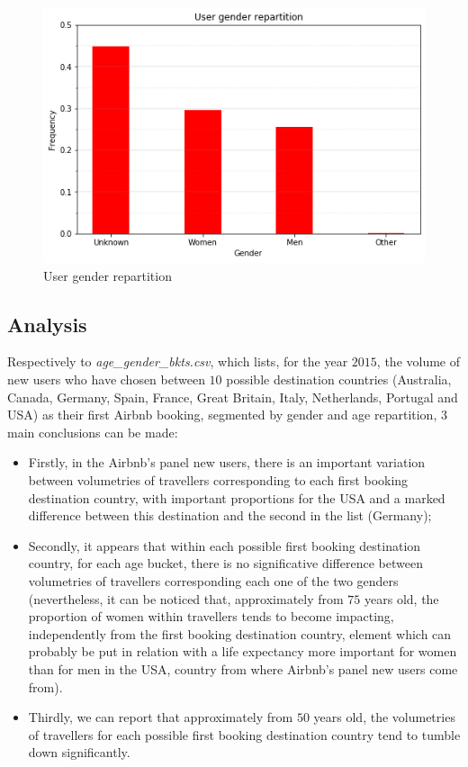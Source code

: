 \documentclass[twocolumn, switch]{article}
\begin{document}
\begin{figure}[H]
\centering
\includegraphics[scale=0.35]{../graphs/train_users_2_gender}
\caption{User gender repartition}
\label{fig:gender}
\end{figure}

\subsection{Analysis}

Respectively to \textit{age\_gender\_bkts.csv}, which lists, for the year $2015$, the volume of new users who have chosen between $10$ possible destination countries (Australia, Canada, Germany, Spain, France, Great Britain, Italy, Netherlands, Portugal and USA) as their first Airbnb booking, segmented by gender and age repartition, $3$ main conclusions can be made:
\begin{itemize}
\item Firstly, in the Airbnb's panel new users, there is an important variation between volumetries of travellers corresponding to each first booking destination country, with important proportions for the USA and a marked difference between this destination and the second in the list (Germany);
\item Secondly, it appears that within each possible first booking destination country, for each age bucket, there is no significative difference between volumetries of travellers corresponding each one of the two genders (nevertheless, it can be noticed that, approximately from $75$ years old, the proportion of women within travellers tends to become impacting, independently from the first booking destination country, element which can probably be put in relation with a life expectancy more important for women than for men in the USA, country from where Airbnb's panel new users come from).
\item Thirdly, we can report that approximately from $50$ years old, the volumetries of travellers for each possible first booking destination country tend to tumble down significantly.
\end{itemize}
\end{document}
